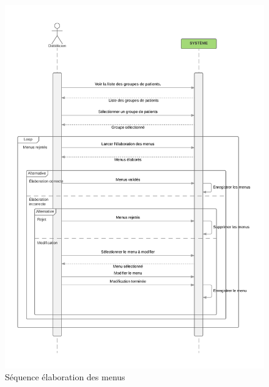 \begin{figure}
  \centering
      \includegraphics[width=1.00\textwidth]{../../CasDUtilisations/MenuGen/Sequence/ElaborationMenus.png} %
\caption{Séquence élaboration des menus}
\label{MenuGenSeq}
\end{figure}
